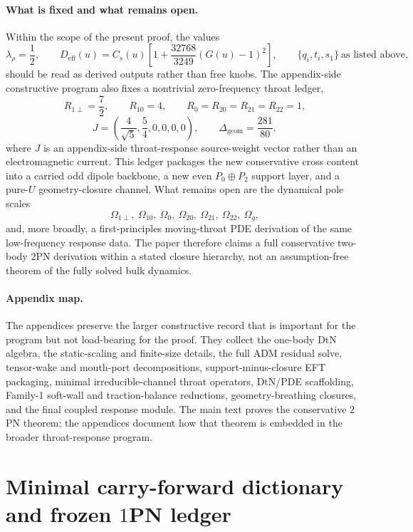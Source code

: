 \documentclass[11pt]{article}
\newcommand{\ADM}{\mathrm{ADM}}
\newcommand{\DtN}{\mathrm{DtN}}
\newcommand{\eff}{\mathrm{eff}}
\newcommand{\geom}{\mathrm{geom}}
\begin{document}
\paragraph{What is fixed and what remains open.}
Within the scope of the present proof, the values
\[
\lambda_\rho=\frac12,
\qquad
D_{\eff}(u)=C_s(u)\left[1+\frac{32768}{3249}(G(u)-1)^2\right],
\qquad
\{q_i,t_i,s_1\}\ \text{as listed above},
\]
should be read as derived outputs rather than free knobs. The appendix-side constructive program also fixes a nontrivial zero-frequency throat ledger,
\[
R_{1\perp}=\frac72,
\qquad
R_{10}=4,
\qquad
R_0=R_{20}=R_{21}=R_{22}=1,
\]
\[
J=\left(\frac{4}{\sqrt5},\frac54,0,0,0,0\right),
\qquad
\Delta_{\geom}=\frac{281}{80},
\]
where \(J\) is an appendix-side throat-response source-weight vector rather than
an electromagnetic current. This ledger packages the new conservative cross
content into a carried odd dipole backbone, a new even $P_0\oplus P_2$ support
layer, and a pure-$U$ geometry-closure channel. What remains open are the
dynamical pole scales
\[
\Omega_{1\perp},\ \Omega_{10},\ \Omega_0,\ \Omega_{20},\ \Omega_{21},\ \Omega_{22},\ \Omega_g,
\]
and, more broadly, a first-principles moving-throat PDE derivation of the same low-frequency response data. The paper therefore claims a full conservative two-body $2$PN derivation within a stated closure hierarchy, not an assumption-free theorem of the fully solved bulk dynamics.

\paragraph{Appendix map.}
The appendices preserve the larger constructive record that is important for the program but not load-bearing for the proof. They collect the one-body $\DtN$ algebra, the static-scaling and finite-size details, the full $\ADM$ residual solve, tensor-wake and mouth-port decompositions, support-minus-closure EFT packaging, minimal irreducible-channel throat operators, $\DtN$/PDE scaffolding, Family-1 soft-wall and traction-balance reductions, geometry-breathing closures, and the final coupled response module. The main text proves the conservative $2$PN theorem; the appendices document how that theorem is embedded in the broader throat-response program.

\section{Minimal carry-forward dictionary and frozen \texorpdfstring{$1$}{1}PN ledger}
\label{sec:carry-forward}
\end{document}
